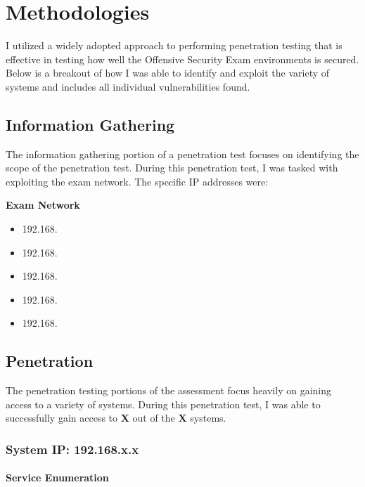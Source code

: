 \hypertarget{methodologies}{%
\section{Methodologies}\label{methodologies}}

I utilized a widely adopted approach to performing penetration testing
that is effective in testing how well the Offensive Security Exam
environments is secured. Below is a breakout of how I was able to
identify and exploit the variety of systems and includes all individual
vulnerabilities found.

\hypertarget{information-gathering}{%
\subsection{Information Gathering}\label{information-gathering}}

The information gathering portion of a penetration test focuses on
identifying the scope of the penetration test. During this penetration
test, I was tasked with exploiting the exam network. The specific IP
addresses were:

\textbf{Exam Network}

\begin{itemize}
\tightlist
\item
  192.168.
\item
  192.168.
\item
  192.168.
\item
  192.168.
\item
  192.168.
\end{itemize}

\hypertarget{penetration}{%
\subsection{Penetration}\label{penetration}}

The penetration testing portions of the assessment focus heavily on
gaining access to a variety of systems. During this penetration test, I
was able to successfully gain access to \textbf{X} out of the \textbf{X}
systems.

\hypertarget{system-ip-192.168.x.x}{%
\subsubsection{System IP: 192.168.x.x}\label{system-ip-192.168.x.x}}

\hypertarget{service-enumeration}{%
\paragraph{Service Enumeration}\label{service-enumeration}}

